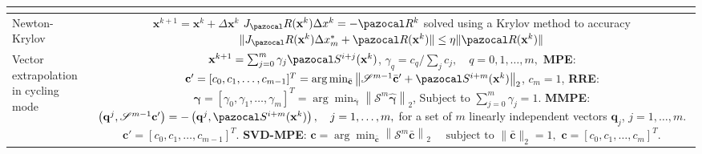 \begin{table}[htbp]
\begin{tabular}{l c}
{    }\\
    \hline
    Newton-Krylov & \makecell[l]{\vphantom{\Huge |} \(\mathbf x^{k+1} = \mathbf x^{k} +\Delta \mathbf x^k\)\\
    \(J_\pazocal R(\mathbf x^k)\Delta x^k = -\pazocal R^k\) solved using a Krylov method\\
    to accuracy \(  \|J_\pazocal R(\mathbf x^k) \Delta x^*_m+ \pazocal R(\mathbf x^k)\| \leq \eta\|\pazocal R(\mathbf x^k)\|\)}
    \\
    \hline
    \makecell[l]{Vector extrapolation\\ in cycling mode} & \makecell[l]{\vphantom{\Huge |}
    \(\mathbf x^{k+1} = \sum_{j=0}^m \gamma_j \pazocal S^{i+j}(\mathbf x^k)\),\\
    \(\gamma_q = c_q/\sum_j c_j,\quad q=0,1,\dots,m,\)\\
    \textbf{MPE}: \(\mathbf c ' = [c_0,c_1,\dots,c_{m-1}]^T = \arg \min_{\bar{\mathbf c}} \left\|\mathscr S^{m-1} \bar{\mathbf c}^\prime + \pazocal S^{i+m}(\mathbf x^k)\right\|_2\),\\
    \(c_m=1\),\\
    \textbf{RRE}: \(\boldsymbol{\gamma} = [\gamma_0,\gamma_1,\dots,\gamma_{m}]^T = \arg \min_{\bar{\boldsymbol{ \gamma}}} \left\|\mathscr S^{m} \hat{\boldsymbol{\gamma}}\right\|_2\),\\
    Subject to \(\sum_{j=0}^m \gamma_j =1\).\\
    \textbf{MMPE}: \(\left(\mathbf q^{j}, \mathscr S^{m-1} \mathbf c^{\prime}\right)=-\left(\mathbf q^{j}, \pazocal S^{i+m}(\mathbf x^k)\right), \quad j=1, \ldots, m,\)\\
    for a set of \(m\) linearly independent vectors \(\mathbf q_j\), \(j=1, \dots, m\).\\
    \(\mathbf c ' = [c_0,c_1,\dots,c_{m-1}]^T.\)\\
    \textbf{SVD-MPE}: \(\mathbf c = \arg\min_{\bar{\mathbf c}}\left\|\mathscr S^{m} \bar{\mathbf c}\right\|_{2} \quad \text { subject to }\|\bar{\mathbf c}\|_{2}=1,\)\\
    \(\mathbf c=\left[c_{0}, c_{1}, \ldots, c_{m}\right]^{T}\).
    }\\
  \hline\hline
  \end{tabular}
\end{table}

\newpage\null\thispagestyle{blank}\newpage
